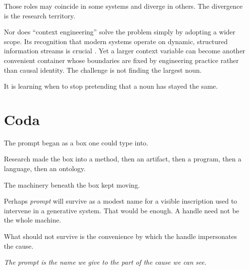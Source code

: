 \documentclass[11pt]{article}
\begin{document}
Those roles may coincide in some systems and diverge in others. The divergence is the research territory.

Nor does ``context engineering'' solve the problem simply by adopting a wider scope. Its recognition that modern systems operate on dynamic, structured information streams is crucial \citep{Mei2025ContextEngineering}. Yet a larger context variable can become another convenient container whose boundaries are fixed by engineering practice rather than causal identity. The challenge is not finding the largest noun.

It is learning when to stop pretending that a noun has stayed the same.

\section*{Coda}

The prompt began as a box one could type into.

Research made the box into a method, then an artifact, then a program, then a language, then an ontology.

The machinery beneath the box kept moving.

Perhaps \emph{prompt} will survive as a modest name for a visible inscription used to intervene in a generative system. That would be enough. A handle need not be the whole machine.

What should not survive is the convenience by which the handle impersonates the cause.

\vspace{0.8em}
\begin{center}
\emph{The prompt is the name we give to the part of the cause we can see.}
\end{center}
\end{document}
